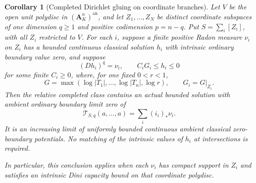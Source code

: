 \documentclass[11pt,a4paper]{article}
\numberwithin{equation}{section}
\newtheorem{corollary}[theorem]{Corollary}
\theoremstyle{definition}
\theoremstyle{remark}
\newcommand{\an}{\mathrm{an}}
\begin{document}
\begin{corollary}[Completed Dirichlet gluing on coordinate branches]
\label{cor:r3-coordinate-completed-dirichlet}
Let $V$ be the open unit polydisc in
$(\mathbf A_K^n)^{\an}$, and let $Z_1,\ldots,Z_N$ be
distinct coordinate subspaces of one dimension $q\geq1$ and
positive codimension $p=n-q$. Put
$S=\sum_i[Z_i]$, with all $Z_i$ restricted to $V$.
For each $i$, suppose a finite positive Radon measure $\nu_i$
on $Z_i$ has a bounded continuous classical solution $h_i$
with intrinsic ordinary boundary value zero, and suppose
\[
 (Dh_i)^q=\nu_i,\qquad
 C_iG_i\leq h_i\leq0
\]
for some finite $C_i\geq0$, where, for one fixed $0<r<1$,
\[
 G=\max(\log|T_1|,\ldots,\log|T_n|,\log r),
 \qquad G_i=G|_{Z_i}.
\]
Then the relative completed class contains an actual bounded
solution with ambient ordinary boundary limit zero of
\[
 \mathcal T_{S,q}(a,\ldots,a)
                  =\sum_i(i_i)_*\nu_i.
\]
It is an increasing limit of uniformly bounded continuous
ambient classical zero-boundary potentials. No matching of
the intrinsic values of $h_i$ at intersections is required.

In particular, this conclusion applies when each $\nu_i$ has
compact support in $Z_i$ and satisfies an intrinsic Dini
capacity bound on that coordinate polydisc.
\end{corollary}
\end{document}
